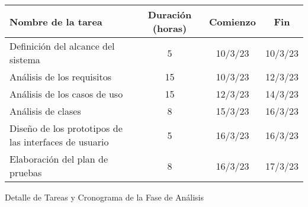 \begin{planificacion}
	\centering
	\begin{tabular}{ | m{9cm} | c | c | c | }
		\hline
		\textbf{Nombre de la tarea}                           & \textbf{Duración (horas)} & \textbf{Comienzo} & \textbf{Fin} \\\hline
		Definición del alcance del sistema                    & 5                         & 10/3/23           & 10/3/23      \\\hline
		Análisis de los requisitos                            & 15                        & 10/3/23           & 12/3/23      \\\hline
		Análisis de los casos de uso                          & 15                        & 12/3/23           & 14/3/23      \\\hline
		Análisis de clases                                    & 8                         & 15/3/23           & 16/3/23      \\\hline
		Diseño de los prototipos de las interfaces de usuario & 5                         & 16/3/23           & 16/3/23      \\\hline
		Elaboración del plan de pruebas                       & 8                         & 16/3/23           & 17/3/23      \\\hline
	\end{tabular}
	\caption{Detalle de Tareas y Cronograma de la Fase de Análisis}
	\label{table:analysis_design_phase}
\end{planificacion}